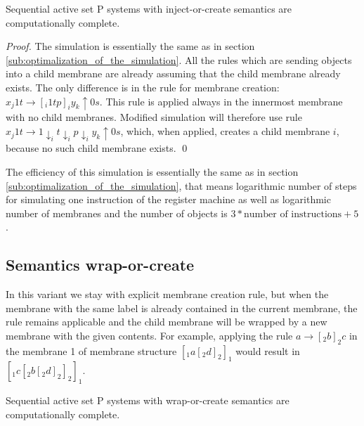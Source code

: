 \documentclass[submission,copyright,creativecommons]{../lib/lncs/llncs}
\begin{document}

\begin{theorem}
  Sequential active set P systems with inject-or-create semantics are computationally complete.
\end{theorem}

\begin{proof}
  The simulation is essentially the same as in section \ref{sub:optimalization_of_the_simulation}. All the rules which are sending objects into a child membrane are already assuming that the child membrane already exists. The only difference is in the rule for membrane creation: $x_j1t \rightarrow [_i 1tp]_iy_k\uparrow 0s$. This rule is applied always in the innermost membrane with no child membranes. Modified simulation will therefore use rule $x_j1t \rightarrow 1\downarrow_i t\downarrow_i p\downarrow_i y_k\uparrow 0s$, which, when applied, creates a child membrane $i$, because no such child membrane exists. \qed
\end{proof}

The efficiency of this simulation is essentially the same as in section \ref{sub:optimalization_of_the_simulation}, that means logarithmic number of steps for simulating one instruction of the register machine as well as logarithmic number of membranes and the number of objects is $3 * \text{number of instructions} + 5$.


\subsection{Semantics wrap-or-create} %
\label{sub:semantics_wrap_or_create}

In this variant we stay with explicit membrane creation rule, but when the membrane with the same label is already contained in the current membrane, the rule remains applicable and the child membrane will be wrapped by a new membrane with the given contents. For example, applying the rule $a \rightarrow [_2 b ]_2 c$ in the membrane 1 of membrane structure $[_1 a [_2 d ]_2 ]_1$ would result in $[_1 c [_2 b [_2 d ]_2 ]_2 ]_1$.


\begin{theorem}
  Sequential active set P systems with wrap-or-create semantics are computationally complete.
\end{theorem}
\end{document}
